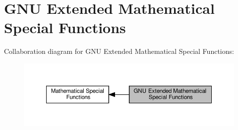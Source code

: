 \hypertarget{group__mathsf__gnu}{}\section{G\+NU Extended Mathematical Special Functions}
\label{group__mathsf__gnu}
Collaboration diagram for G\+NU Extended Mathematical Special Functions\+:
\nopagebreak
\begin{figure}[H]
\begin{center}
\leavevmode
\includegraphics[width=350pt]{group__mathsf__gnu}
\end{center}
\end{figure}
